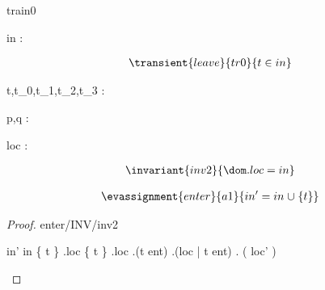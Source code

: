 \documentclass[12pt]{amsart}
\title{}
\author{}
\date{} %
\begin{document}
\maketitle
\tableofcontents


\begin{machine}{train0}


%
	\begin{variable}
		in : \set[\TRAIN]
	\end{variable}
%



\begin{align*}
\transient{leave}{tr0}
{	t \in in	}
\end{align*}

\begin{dummy}
	t,t_0,t_1,t_2,t_3 : \TRAIN
\end{dummy}

\begin{dummy}
	p,q : \BLK
\end{dummy}


\begin{variable}
	loc : \TRAIN \pfun \BLK
\end{variable}

\begin{align*}
\invariant{inv2}
{	\dom . loc = in	}
\end{align*}

\begin{align*}
\evassignment{enter}{a1}
{	in' = in \bunion \{ t \}	}
\end{align*}

\begin{proof}{enter/INV/inv2}
	\begin{calculation}
		in'
	\hint{=}{ \ref{a1} }
		in \bunion \{ t \}
	\hint{=}{ \ref{inv2} }
		\dom.loc \bunion \{ t \}
		\dom.loc \bunion \dom.(t \tfun ent)
		\dom.(loc   |   t \tfun ent)
	\hint{=}{ \ref{a2} }
		\dom. ( loc' )
	\end{calculation}
\end{proof}


\end{machine}
\end{document}

